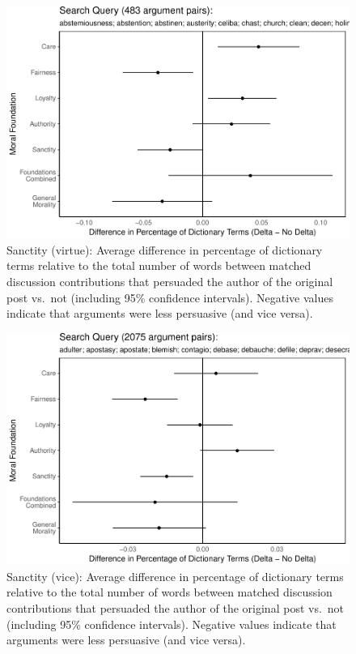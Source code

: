 \documentclass[12pt,]{article}
\begin{document}
\begin{figure}
\centering
\includegraphics{prelim_files/figure-latex/purity virtue-1.pdf}
\caption{Sanctity (virtue): Average difference in percentage of
dictionary terms relative to the total number of words between matched
discussion contributions that persuaded the author of the original post
vs.~not (including 95\% confidence intervals). Negative values indicate
that arguments were less persuasive (and vice versa).}
\end{figure}

\begin{figure}
\centering
\includegraphics{prelim_files/figure-latex/purity vice-1.pdf}
\caption{Sanctity (vice): Average difference in percentage of dictionary
terms relative to the total number of words between matched discussion
contributions that persuaded the author of the original post vs.~not
(including 95\% confidence intervals). Negative values indicate that
arguments were less persuasive (and vice versa).}
\end{figure}
\end{document}
